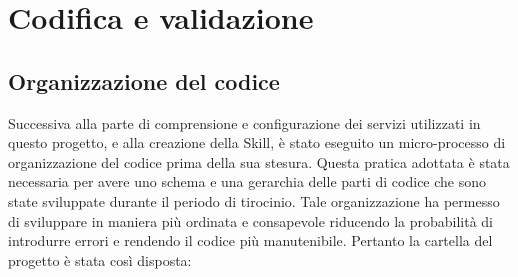 
\chapter{Codifica e validazione}
\label{cap:progettazione}
\section{Organizzazione del codice}
Successiva alla parte di comprensione e configurazione dei servizi utilizzati in questo progetto, e alla creazione della Skill, è stato eseguito un micro-processo di organizzazione del codice prima della sua stesura. Questa pratica adottata è stata necessaria per avere uno schema e una gerarchia delle parti di codice che sono state sviluppate durante il periodo di tirocinio. Tale organizzazione ha permesso di sviluppare in maniera più ordinata e consapevole riducendo la probabilità di introdurre errori e rendendo il codice più manutenibile. Pertanto la cartella del progetto è stata così disposta:
